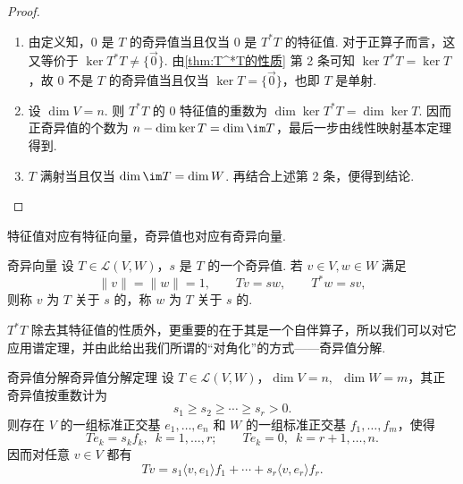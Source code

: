 \begin{proof}
    \begin{enumerate}
        \item 由定义知，$0$ 是 $T$ 的奇异值当且仅当 $0$ 是 $T^*T$ 的特征值. 对于正算子而言，这又等价于 $\ker T^*T \neq \{\vec{0}\}$. 由\autoref{thm:T^*T的性质} 第 2 条可知 $\ker T^*T = \ker T$，故 $0$ 不是 $T$ 的奇异值当且仅当 $\ker T = \{\vec{0}\}$，也即 $T$ 是单射.

        \item 设 $\dim V = n$. 则 $T^*T$ 的 $0$ 特征值的重数为 $\dim \ker T^*T = \dim \ker T$. 因而正奇异值的个数为 $n - \dim \ker T = \dim \im T$，最后一步由线性映射基本定理得到.

        \item $T$ 满射当且仅当 $\dim \im T = \dim W$. 再结合上述第 2 条，便得到结论.
    \end{enumerate}
\end{proof}

特征值对应有特征向量，奇异值也对应有奇异向量.

\begin{definition}{奇异向量}{} 
    设 $T \in \mathcal{L}(V, W)$，$s$ 是 $T$ 的一个奇异值. 若 $v \in V, w \in W$ 满足
    \[
        \lVert v \rVert = \lVert w \rVert = 1,\qquad Tv = sw,\qquad T^*w = sv,
    \]
    则称 $v$ 为 $T$ 关于 $s$ 的，称 $w$ 为 $T$ 关于 $s$ 的.
\end{definition}

$T^*T$ 除去其特征值的性质外，更重要的在于其是一个自伴算子，所以我们可以对它应用谱定理，并由此给出我们所谓的“对角化”的方式——奇异值分解.

\begin{theorem}{奇异值分解}{奇异值分解定理} 
    设 $T \in \mathcal{L}(V, W)$，$\dim V = n,\enspace \dim W = m$，其正奇异值按重数计为
    \[
        s_1 \geqslant s_2 \geqslant \cdots \geqslant s_r > 0.
    \]
    则存在 $V$ 的一组标准正交基 $e_1, \ldots, e_n$ 和 $W$ 的一组标准正交基 $f_1, \ldots, f_m$，使得
    \[
        Te_k = s_k f_k,\enspace k = 1, \ldots, r;\qquad Te_k = 0,\enspace k = r+1, \ldots, n.
    \]
    因而对任意 $v \in V$ 都有
    \[
        Tv = s_1 \langle v, e_1 \rangle f_1 + \cdots + s_r \langle v, e_r \rangle f_r.
    \]
\end{theorem}

